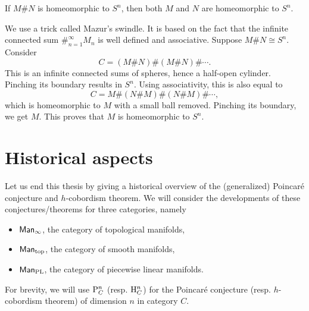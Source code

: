 \begin{lemma}
    If $M \# N$ is homeomorphic to $S^{n}$, then both $M$ and $N$ are homeomorphic to $S^{n}$.
\end{lemma}
\begin{myproof}
    We use a trick called Mazur's swindle.
    It is based on the fact that the infinite connected sum $\#_{n=1}^{\infty} M_n$ is well defined and associative.
    Suppose $M \# N \cong S^{n}$.
    Consider
    \[
       C =  (M \# N) \# 
        (M \# N) \#  \cdots
    .\] 
    This is an infinite connected sums of spheres, hence a half-open cylinder.
    Pinching its boundary results in $S^{n}$.
    Using associativity, this is also equal to
    \[
        C= M
        \# (N \# M)
        \# (N \# M)
        \# \cdots
    ,\] 
    which is homeomorphic to $M$ with a small ball removed. Pinching its boundary, we get $M$.
    This proves that $M$ is homeomorphic to $S^{n}$.
\end{myproof}




\section{Historical aspects}
\label{sec:history}

Let us end this thesis by giving a historical overview of the (generalized) Poincaré conjecture and $h$-cobordism theorem.
We will consider the developments of these conjectures/theorems for three categories, namely
\begin{itemize}
    \item $\textsf{Man}_{\infty}$, the category of topological manifolds,
    \item $\textsf{Man}_{\text{top}}$, the category of smooth manifolds,
    \item $\textsf{Man}_{\text{PL}}$, the category of piecewise linear manifolds.
\end{itemize}
For brevity, we will use $\mathrm P_{C}^{n}$ (resp. $\mathrm H_{C}^{n}$) for the Poincaré conjecture (resp. $h$-cobordism theorem) of dimension $n$ in category $C$.

